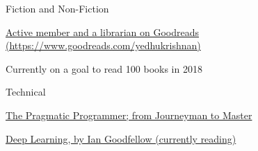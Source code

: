 \begin{cventries}
  \cventry
    {Fiction and Non-Fiction}
    {}
    {}
    {}
    {
      \begin{cvitems}
        \item {\href{https://www.goodreads.com/yedhukrishnan}{Active member and a librarian on Goodreads (https://www.goodreads.com/yedhukrishnan)}}
        \item {Currently on a goal to read 100 books in 2018}
      \end{cvitems}
    }
  \cventry
    {Technical}
    {}
    {}
    {}
    {
      \begin{cvitems}
        \item {\href{https://www.goodreads.com/book/show/4099.The_Pragmatic_Programmer}{The Pragmatic Programmer; from Journeyman to Master}}
        \item {\href{https://www.goodreads.com/book/show/30422361-deep-learning}{Deep Learning, by Ian Goodfellow (currently reading)}}
      \end{cvitems}
    }
\end{cventries}
